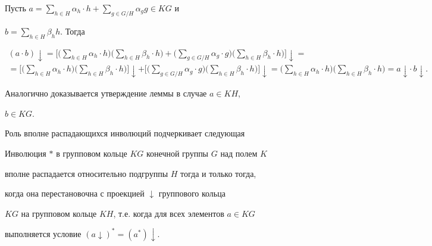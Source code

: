 \begin{pf}


Пусть $a=\sum\limits_{h\in H}\alpha_h\cdot h+


\sum\limits_{g\in G/H}\alpha_gg\in KG$ и


$b=\sum\limits_{h\in H}\beta_hh$. Тогда


\begin{gather*}


(a\cdot b)\downarrow =


\biggl[\biggl(\sum_{h\in H}\alpha_h\cdot h\biggr)


\biggl(\sum_{h\in H}\beta_h\cdot h \biggr)+


\biggl(\sum_{g\in G/H}\alpha_g\cdot g \biggr)


\biggl(\sum_{h\in H}\beta_h\cdot h \biggr)\biggr]\downarrow =\\


= \biggl[\biggl(\sum_{h\in H}\alpha_h\cdot h \biggr)


\biggl(\sum_{h\in H}\beta_h\cdot h \biggr)\biggr]\downarrow +


\biggl[\biggl(\sum_{g\in G/H}\alpha_g\cdot g \biggr)


\biggl(\sum_{h\in H}\beta_h\cdot h \biggr)\biggr]\downarrow=


\biggl(\sum_{h\in H}\alpha_h\cdot h \biggr)


\biggl(\sum_{h\in H}\beta_h\cdot h \biggr)=a\downarrow


\cdot\, b\downarrow.


\end{gather*}


Аналогично доказывается утверждение леммы в случае $a\in KH$,


$b\in KG$.


\end{pf}





Роль вполне распадающихся инволюций подчеркивает следующая





\begin{lem}


Инволюция $*$ в групповом кольце $KG$ конечной группы $G$ над полем $K$


вполне распадается относительно подгруппы $H$ тогда и только тогда,


когда она перестановочна с проекцией $\downarrow$ группового кольца


$KG$ на групповом кольце $KH$, т.е. когда для всех элементов $a\in KG$


выполняется условие $(a\downarrow)^*=(a^*)\downarrow$.


\end{lem}






